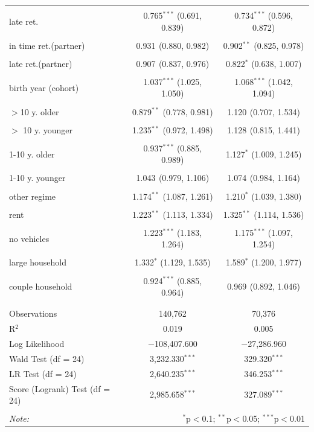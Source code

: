 \documentclass[a4paper,10pt,oneside,english]{article}
\begin{document}
\begin{table}[H]
\begin{tabular}{@{\extracolsep{5pt}}lcc}
		& & \\ 
		late ret. & 0.765$^{***}$ (0.691, 0.839) & 0.734$^{***}$ (0.596, 0.872) \\ 
		& & \\ 
		in time ret.(partner) & 0.931$^{}$ (0.880, 0.982) & 0.902$^{**}$ (0.825, 0.978) \\ 
		& & \\ 
		late ret.(partner) & 0.907$^{}$ (0.837, 0.976) & 0.822$^{*}$ (0.638, 1.007) \\ 
		& & \\ 
		birth year (cohort) & 1.037$^{***}$ (1.025, 1.050) & 1.068$^{***}$ (1.042, 1.094) \\ 
		& & \\ 
		$>$10 y. older & 0.879$^{**}$ (0.778, 0.981) & 1.120$^{}$ (0.707, 1.534) \\ 
		& & \\ 
		$>$ 10 y. younger & 1.235$^{**}$ (0.972, 1.498) & 1.128$^{}$ (0.815, 1.441) \\ 
		& & \\ 
		1-10 y. older & 0.937$^{***}$ (0.885, 0.989) & 1.127$^{*}$ (1.009, 1.245) \\ 
		& & \\ 
		1-10 y. younger & 1.043$^{}$ (0.979, 1.106) & 1.074$^{}$ (0.984, 1.164) \\ 
		& & \\ 
		other regime & 1.174$^{**}$ (1.087, 1.261) & 1.210$^{*}$ (1.039, 1.380) \\ 
		& & \\ 
		rent & 1.223$^{**}$ (1.113, 1.334) & 1.325$^{**}$ (1.114, 1.536) \\ 
		& & \\ 
		no vehicles & 1.223$^{***}$ (1.183, 1.264) & 1.175$^{***}$ (1.097, 1.254) \\ 
		& & \\ 
		large household & 1.332$^{*}$ (1.129, 1.535) & 1.589$^{*}$ (1.200, 1.977) \\ 
		& & \\ 
		couple household & 0.924$^{***}$ (0.885, 0.964) & 0.969$^{}$ (0.892, 1.046) \\ 
		& & \\ 
		\hline \\[-1.8ex] 
		Observations & 140,762 & 70,376 \\ 
		R$^{2}$ & 0.019 & 0.005 \\ 
		Log Likelihood & $-$108,407.600 & $-$27,286.960 \\ 
		Wald Test (df = 24) & 3,232.330$^{***}$ & 329.320$^{***}$ \\ 
		LR Test (df = 24) & 2,640.235$^{***}$ & 346.253$^{***}$ \\ 
		Score (Logrank) Test (df = 24) & 2,985.658$^{***}$ & 327.089$^{***}$ \\ 
		\hline 
		\hline \\[-1.8ex] 
		\textit{Note:}  & \multicolumn{2}{r}{$^{*}$p$<$0.1; $^{**}$p$<$0.05; $^{***}$p$<$0.01} \\ 
	\end{tabular} 
\end{table} 
\end{document}
